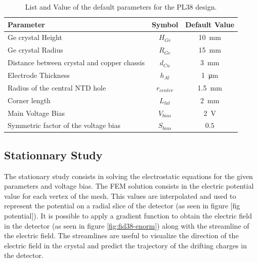 \begin{table}[]
\centering
\begin{tabular}{l c S}
Parameter                                   & Symbol        & {Default Value} \\ \hline \hline
Ge crystal Height                           & $H_{Ge}$      & \SI{10}{\mm}  \\
Ge crystal Radius                           & $R_{Ge}$      & \SI{15}{\mm}    \\
Distance between crystal and copper chassis & $d_{Cu}$      & \SI{3}{\mm}     \\
Electrode Thickness                         & $h_{Al}$      & \SI{1}{\micro\meter}   \\
Radius of the central NTD hole    & $r_{center}$   & \SI{1.5}{\mm}   \\
Corner length & $L_{lat}$ & \SI{2}{\mm}  \\
Main Voltage Bias                           & $V_{bias}$    & \SI{2}{\volt}      \\
Symmetric factor of the voltage bias        & $S_{bias}$    & {$0.5$}         
\end{tabular}
\caption{List and Value of the default parameters for the PL38 design.}
\label{tab:pl38-default-parameters}
\end{table}


\subsection{Stationnary Study}

The stationary study consists in solving the electrostatic equations for the given parameters and voltage bias. The FEM solution consists in the electric potential value for each vertex of the mesh. This values are interpolated and used to represent the potential on a radial slice of the detector (as seen in figure [fig potential]). It is possible to apply a gradient function to obtain the electric field in the detector (as seen in figure \ref{fig:fid38-enorm}) along with the streamline of the electric field. The streamlines are useful to visualize the direction of the electric field in the crystal and predict the trajectory of the drifting charges in the detector.

